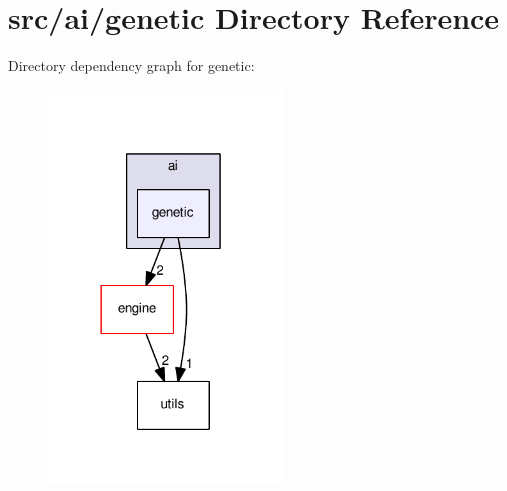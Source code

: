 \section{src/ai/genetic Directory Reference}
\label{dir_43596c0b3cf30b801e31b375b5bbc130}
Directory dependency graph for genetic\+:
\nopagebreak
\begin{figure}[H]
\begin{center}
\leavevmode
\includegraphics[width=177pt]{dir_43596c0b3cf30b801e31b375b5bbc130_dep}
\end{center}
\end{figure}
